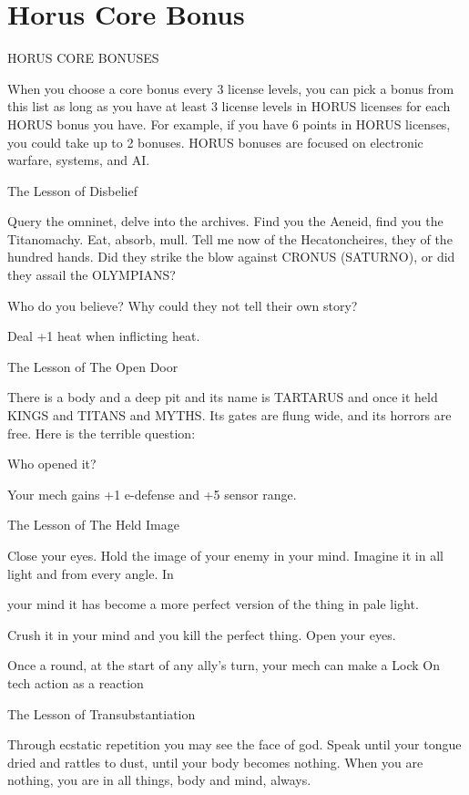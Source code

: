 \section{Horus Core Bonus}

                                      HORUS CORE BONUSES

When you choose a core bonus every 3 license levels, you can pick a bonus from this list as long
as you have at least 3 license levels in HORUS licenses for each HORUS bonus you have. For
example, if you have 6 points in HORUS licenses, you could take up to 2 bonuses. HORUS
bonuses are focused on electronic warfare, systems, and AI.


The Lesson of Disbelief

Query the omninet, delve into the archives. Find you the Aeneid, find you the Titanomachy. Eat, absorb,
mull. Tell me now of the Hecatoncheires, they of the hundred hands. Did they strike the blow against
CRONUS (SATURNO), or did they assail the OLYMPIANS?

Who do you believe? Why could they not tell their own story?

Deal +1 heat when inflicting heat.


The Lesson of The Open Door

There is a body and a deep pit and its name is TARTARUS and once it held KINGS and TITANS and
MYTHS. Its gates are flung wide, and its horrors are free. Here is the terrible question:

Who opened it?

Your mech gains +1 e-defense and +5 sensor range.


The Lesson of The Held Image

Close your eyes. Hold the image of your enemy in your mind. Imagine it in all light and from every angle. In

your mind it has become a more perfect version of the thing in pale light.

Crush it in your mind and you kill the perfect thing. Open your eyes.

Once a round, at the start of any ally’s turn, your mech can make a Lock On tech action as a
reaction


The Lesson of Transubstantiation

Through ecstatic repetition you may see the face of god. Speak until your tongue dried and rattles to dust,
until your body becomes nothing. When you are nothing, you are in all things, body and mind, always.

